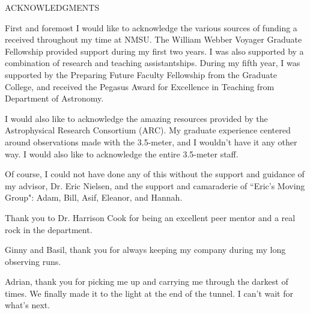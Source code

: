 \begin{center}
ACKNOWLEDGMENTS
\end{center}

First and foremost I would like to acknowledge the various sources of funding a received throughout my time at NMSU. The William Webber Voyager Graduate Fellowship provided support during my first two years. I was also supported by a combination of research and teaching assistantships. During my fifth year, I was supported by the Preparing Future Faculty Fellowship from the Graduate College, and received the Pegasus Award for Excellence in Teaching from Department of Astronomy.

I would also like to acknowledge the amazing resources provided by the Astrophysical Research Consortium (ARC). My graduate experience centered around observations made with the 3.5-meter, and I wouldn't have it any other way. I would also like to acknowledge the entire 3.5-meter staff. 

Of course, I could not have done any of this without the support and guidance of my advisor, Dr. Eric Nielsen, and the support and camaraderie of ``Eric's Moving Group": Adam, Bill, Asif, Eleanor, and Hannah.  

Thank you to Dr. Harrison Cook for being an excellent peer mentor and a real rock in the department.

Ginny and Basil, thank you for always keeping my company during my long observing runs. 

Adrian, thank you for picking me up and carrying me through the darkest of times. We finally made it to the light at the end of the tunnel. I can't wait for what's next.

